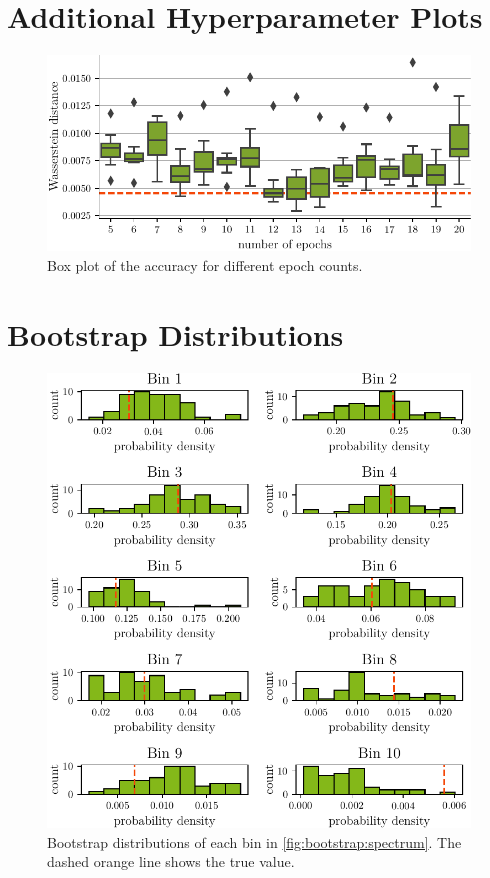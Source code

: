 \clearpage
\section{Additional Hyperparameter Plots}
\begin{figure}
  \centering
  \includegraphics[scale=1]{content/plots/hyperparam/num_epochs_vs_wd_boxplot_lessheight.pdf}
  \caption{Box plot of the accuracy for different epoch counts.}
  \label{fig:hyperparameter:num_epochs_vs_wd_boxplot}
\end{figure}


\clearpage
\section{Bootstrap Distributions}
\begin{figure}
  \centering
  \includegraphics[scale=1]{content/plots/bootstrap:distributions_doubleheight.pdf}
  \caption{
    Bootstrap distributions of each bin in \autoref{fig:bootstrap:spectrum}.
    The dashed orange line shows the true value.
  }
  \label{fig:bootstrap:distributions}
\end{figure}


